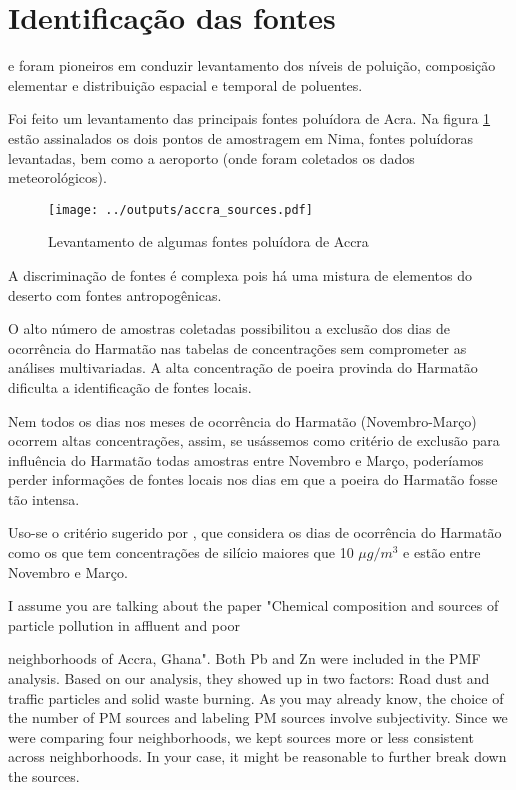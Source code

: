 \section{Identificação das fontes}

\citep{ARKU2008} e \citep{DIONISIO2010} foram pioneiros em conduzir  
levantamento dos níveis de poluição, composição elementar e 
distribuição espacial e temporal de poluentes.

Foi feito um levantamento das principais fontes poluídora de Acra.
Na figura \ref{fg:acrasources} estão assinalados os dois pontos de 
amostragem em Nima, fontes poluídoras levantadas, bem como a aeroporto
(onde foram coletados os dados meteorológicos).

\begin{figure}[H]
  \centering
  \texttt{[image: ../outputs/accra\_sources.pdf]}
  \caption{Levantamento de algumas fontes poluídora de Accra \label{fg:acrasources}}
\end{figure}


A discriminação de fontes é complexa pois
há uma mistura de elementos do deserto com fontes antropogênicas.

O alto número de amostras coletadas possibilitou a exclusão dos dias de 
ocorrência do Harmatão nas tabelas de concentrações sem comprometer as análises
multivariadas. A alta concentração de poeira provinda do Harmatão dificulta a 
identificação de fontes locais.

Nem todos os dias nos meses de ocorrência do Harmatão (Novembro-Março) 
ocorrem altas concentrações, assim, se usássemos como critério de exclusão para 
influência do Harmatão todas amostras entre Novembro e Março, poderíamos
perder informações de fontes locais nos dias em que a poeira do Harmatão fosse
tão intensa. 

Uso-se o critério sugerido por \cite{aboh2009}, que considera os dias de 
ocorrência do Harmatão como os que tem concentrações de silício maiores que 
10 $\mu g/m^3$ e estão entre Novembro e Março.



I assume you are talking about the paper "Chemical composition and sources of particle pollution in affluent and poor

neighborhoods of Accra, Ghana". Both Pb and Zn were included in the PMF analysis. Based on our analysis, they showed up in two factors: Road dust and traffic particles and solid waste burning. As you may already know, the choice of the number of PM sources and labeling PM sources involve subjectivity. Since we were comparing four neighborhoods, we kept sources more or less consistent across neighborhoods. In your case, it might be reasonable to further break down the sources.

